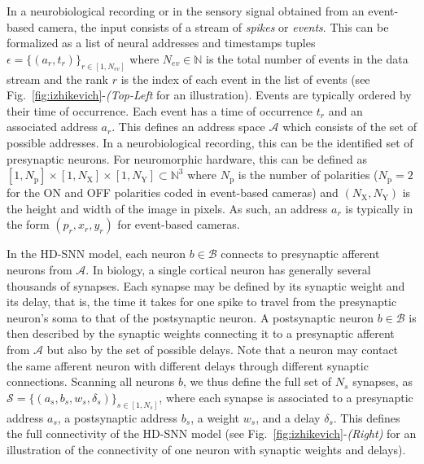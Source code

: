 \documentclass[default]{sn-jnl}%
\theoremstyle{thmstyleone}%
\theoremstyle{thmstyletwo}%
\theoremstyle{thmstylethree}%
\newcommand{\seeFig}[1]{see Fig.~\ref{fig:#1}}%
\newcommand{\presynaddr}{a} %
\newcommand{\postsynaddr}{b} %
\newcommand{\numevent}{N_{ev}} %
\newcommand{\presynaddrspace}{\mathcal{A}} %
\newcommand{\postsynaddrspace}{\mathcal{B}} %
\newcommand{\Npol}{N_\text{p}} %
\newcommand{\arank}{r} %
\newcommand{\synapse}{\mathcal{S}} %
\newcommand{\synapticweight}{w} %
\newcommand{\synapticdelay}{\delta} %
\newcommand{\ranksyn}{s} %
\newcommand{\Nsyn}{N_{s}} %
\newcommand{\timev}{t} %
\newcommand{\polev}{p} %
\newcommand{\event}{\epsilon} %
\newcommand{\Nx}{N_\text{X}}
\newcommand{\Ny}{N_\text{Y}}
\begin{document}
In a neurobiological recording or in the sensory signal obtained from an event-based camera, the input consists of a stream of \emph{spikes} or \emph{events}. This can be formalized as a list of neural addresses and timestamps tuples $\event = \{(\presynaddr_\arank, \timev_\arank)\}_{\arank \in [1,\numevent]}$ where $\numevent \in \mathbb{N} $ is the total number of events in the data stream and the rank $\arank$ is the index of each event in the list of events (\seeFig{izhikevich}-\textit{(Top-Left} for an illustration). Events are typically ordered by their time of occurrence. Each event has a time of occurrence $\timev_\arank$ and an associated address $\presynaddr_\arank$. This defines an address space $\presynaddrspace$ which consists of the set of possible addresses. In a neurobiological recording, this can be the identified set of presynaptic neurons. For neuromorphic hardware, this can be defined as $[1, \Npol] \times [1, \Nx]\times[1, \Ny] \subset \mathbb{N}^3$ where $\Npol$ is the number of polarities ($\Npol=2$ for the ON and OFF polarities coded in event-based cameras) and $(\Nx, \Ny)$ is the height and width of the image in pixels. As such, an address $\presynaddr_\arank$ is typically in the form $(\polev_\arank, x_\arank, y_\arank)$ for event-based cameras.

In the HD-SNN model, each neuron $\postsynaddr \in \postsynaddrspace$ connects to presynaptic afferent neurons from $\presynaddrspace$. In biology, a single cortical neuron has generally several thousands of synapses. Each synapse may be defined by its synaptic weight and its delay, that is, the time it takes for one spike to travel from the presynaptic neuron's soma to that of the postsynaptic neuron. A postsynaptic neuron $\postsynaddr \in \postsynaddrspace$ is then described by the synaptic weights connecting it to a presynaptic afferent from $\presynaddrspace$ but also by the set of possible delays. Note that a neuron may contact the same afferent neuron with different delays through different synaptic connections. Scanning all neurons $\postsynaddr$, we thus define the full set of $\Nsyn$ synapses, 
as $\synapse = \{(\presynaddr_\ranksyn, \postsynaddr_\ranksyn, \synapticweight_\ranksyn, \synapticdelay_\ranksyn)\}_{\ranksyn \in [1,\Nsyn]}$, where each synapse is associated to a presynaptic address $\presynaddr_\ranksyn$, a postsynaptic address $\postsynaddr_\ranksyn$, a weight $\synapticweight_\ranksyn$, and a delay $\synapticdelay_\ranksyn$. This defines the full connectivity of the HD-SNN model (\seeFig{izhikevich}-\textit{(Right)} for an illustration of the connectivity of one neuron with synaptic weights and delays). 
\end{document}
